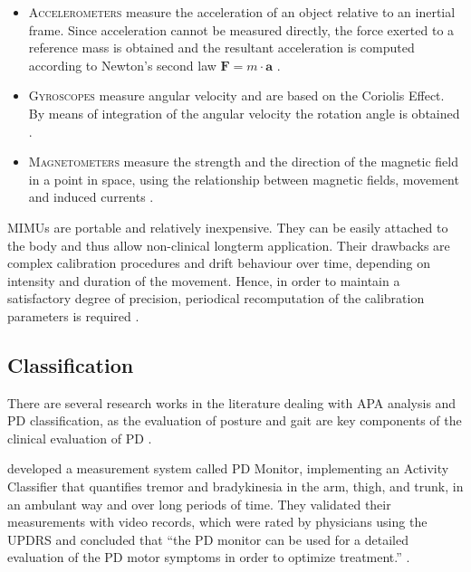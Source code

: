 \begin{itemize}

\item \textsc{Accelerometers} measure the acceleration of an object relative to an inertial frame. Since acceleration cannot be measured directly, the force exerted to a reference mass is obtained and the resultant acceleration is computed according to Newton's second law $ \mathbf{F} = m \cdot \mathbf a $ \cite{encyclopedia_britannica_accelerometer_2014}.

\item \textsc{Gyroscopes} measure angular velocity and are based on the Coriolis Effect. By means of integration of the angular velocity the rotation angle is obtained \cite{olivares_vicente_signal_2013}.

\item \textsc{Magnetometers} measure the strength and the direction of the magnetic field in a point in space, using the relationship between magnetic fields, movement and induced currents \cite{olivares_vicente_signal_2013}.
 
\end{itemize}
MIMUs are portable and relatively inexpensive. They can be easily attached to the body and thus allow non-clinical longterm application. Their drawbacks are complex calibration procedures and drift behaviour over time, depending on intensity and duration of the movement. Hence, in order to maintain a satisfactory degree of precision, periodical recomputation of the calibration parameters is required \cite{olivares_vicente_signal_2013}.

\subsection{Classification}

There are several research works in the literature dealing with APA analysis and PD classification, as the evaluation of posture and gait are key components of the clinical evaluation of PD \cite{palmerini_classification_2013}.

\citeauthor{klerk_long-term_2009} \cite{klerk_long-term_2009} developed a measurement system called PD Monitor, implementing an Activity Classifier that quantifies tremor and bradykinesia in the arm, thigh, and trunk, in an ambulant way and over long periods of time. They validated their measurements with video records, which were rated by physicians using the UPDRS and concluded that ``the PD monitor can be used for a detailed evaluation of the PD motor symptoms in order to optimize treatment.'' \cite{klerk_long-term_2009}.

